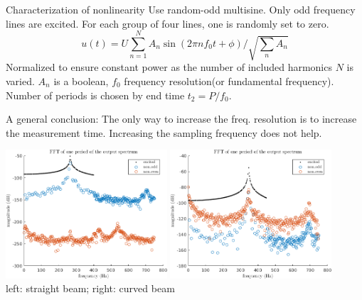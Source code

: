 \documentclass[9pt]{beamer}
\begin{document}
\begin{frame}{Characterization of nonlinearity}
  Use random-odd multisine. Only odd frequency lines are excited. For each group
  of four lines, one is randomly set to zero.
  \begin{equation}
    \label{eq:multisine}
    u(t) = U \sum_{n=1}^N A_n \sin(2\pi nf_0t + \phi) / \textstyle \sqrt{\sum_n A_n}
  \end{equation}
  Normalized to ensure constant power as the number of included harmonics $N$ is
  varied. $A_n$ is a boolean, $f_0$ frequency resolution(or fundamental
  frequency). Number of periods is chosen by end time $t_2=P/f_0$.

  A general conclusion: The only way to increase the freq. resolution is to
  increase the measurement time. Increasing the sampling frequency does not
  help.

    \begin{center}
      \includegraphics[width=0.45\textwidth]{fig/ms_nl_detection_b2}
      \includegraphics[width=0.45\textwidth]{fig/ms_nl_detection_b3}\\
      left: straight beam; right: curved beam
    \end{center}
\end{frame}
\end{document}
